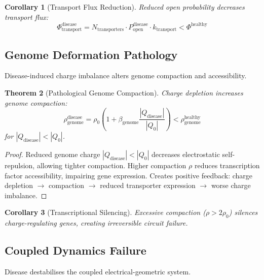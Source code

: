 \documentclass[11pt,twocolumn,a4paper]{article}
\newtheorem{theorem}{Theorem}[section]
\newtheorem{corollary}[theorem]{Corollary}
\theoremstyle{definition}
\theoremstyle{remark}
\begin{document}
\begin{corollary}[Transport Flux Reduction]
\label{cor:transport_reduction}
Reduced open probability decreases transport flux:
\begin{equation}
\Phi_{\text{transport}}^{\text{disease}} = N_{\text{transporters}} \cdot P_{\text{open}}^{\text{disease}} \cdot k_{\text{transport}} < \Phi^{\text{healthy}}
\end{equation}
\end{corollary}

\subsection{Genome Deformation Pathology}

Disease-induced charge imbalance alters genome compaction and accessibility.

\begin{theorem}[Pathological Genome Compaction]
\label{thm:pathological_compaction}
Charge depletion increases genome compaction:
\begin{equation}
\rho_{\text{genome}}^{\text{disease}} = \rho_0 \left(1 + \beta_{\text{genome}} \frac{|Q_{\text{disease}}|}{|Q_0|}\right) < \rho_{\text{genome}}^{\text{healthy}}
\end{equation}
for $|Q_{\text{disease}}| < |Q_0|$.
\end{theorem}

\begin{proof}
Reduced genome charge $|Q_{\text{disease}}| < |Q_0|$ decreases electrostatic self-repulsion, allowing tighter compaction. Higher compaction $\rho$ reduces transcription factor accessibility, impairing gene expression. Creates positive feedback: charge depletion $\to$ compaction $\to$ reduced transporter expression $\to$ worse charge imbalance.
\end{proof}

\begin{corollary}[Transcriptional Silencing]
\label{cor:transcriptional_silencing}
Excessive compaction ($\rho > 2\rho_0$) silences charge-regulating genes, creating irreversible circuit failure.
\end{corollary}

\subsection{Coupled Dynamics Failure}

Disease destabilises the coupled electrical-geometric system.
\end{document}
